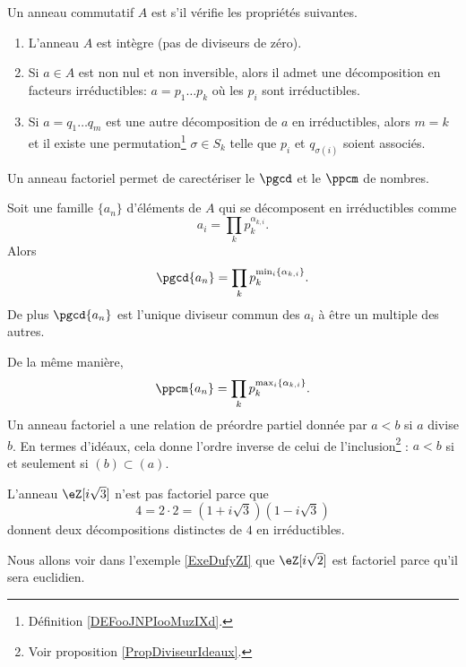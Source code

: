 \begin{definition}
    Un anneau commutatif \( A\) est  s'il vérifie les propriétés suivantes.
    \begin{enumerate}
        \item
            L'anneau \( A\) est intègre (pas de diviseurs de zéro).
        \item
            Si \( a\in A\) est non nul et non inversible, alors il admet une décomposition en facteurs irréductibles: \( a=p_1\ldots p_k\) où les \( p_i\) sont irréductibles.
        \item
            Si \( a=q_1\ldots q_m\) est une autre décomposition de \( a\) en irréductibles, alors \( m=k\) et il existe une permutation\footnote{Définition \ref{DEFooJNPIooMuzIXd}.} \( \sigma\in S_k\) telle que \( p_i\) et \( q_{\sigma(i)}\) soient associés.
    \end{enumerate}
\end{definition}

Un anneau factoriel permet de carectériser le \( \pgcd\) et le \( \ppcm\) de nombres.

\begin{proposition}
Soit une famille \( \{ a_n \}\) d'éléments de \( A\) qui se décomposent en irréductibles comme
\begin{equation}
    a_i=\prod_k p_k^{\alpha_{k,i}}.
\end{equation}
Alors
\begin{equation}
    \pgcd\{ a_n \}=\prod_k p_k^{\min_i\{ \alpha_{k,i} \}}.
\end{equation}
    De plus \( \pgcd\{ a_n \}\) est l'unique diviseur commun des \( a_i\) à être un multiple des autres.
\end{proposition}

De la même manière,
\begin{equation}
    \ppcm\{ a_n \}=\prod_kp_k^{\max_i\{ \alpha_{k,i} \}}.
\end{equation}
Un anneau factoriel a une relation de préordre partiel donnée par \( a<b\) si \( a\) divise \( b\). En termes d'idéaux, cela donne l'ordre inverse de celui de l'inclusion\footnote{Voir proposition \ref{PropDiviseurIdeaux}.} : \( a<b\) si et seulement si \( (b)\subset (a)\).

\begin{example}
    L'anneau \( \eZ[i\sqrt{3}]\) n'est pas factoriel parce que
    \begin{equation}
        4=2\cdot 2=(1+i\sqrt{3})(1-i\sqrt{3})
    \end{equation}
    donnent deux décompositions distinctes de \( 4\) en irréductibles.
\end{example}
Nous allons voir dans l'exemple \ref{ExeDufyZI} que \( \eZ[i\sqrt{2}]\) est factoriel parce qu'il sera euclidien.

